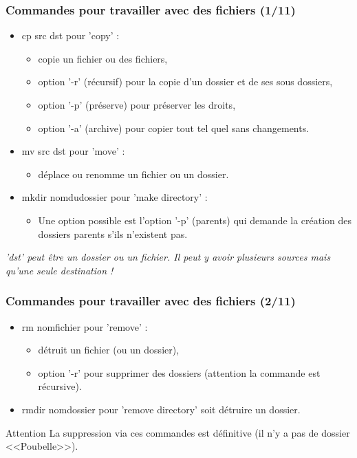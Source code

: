 \documentclass[handout,10pt]{beamer}
\begin{document}
\frame
{
    \frametitle{Commandes pour travailler avec des fichiers (1/11)}

    \begin{itemize}
        \item {\ttfamily cp src dst} pour 'copy' :
            \begin{itemize}
                \item copie un fichier ou des fichiers,
                \item option '-r' (récursif) pour la copie d'un dossier et de ses sous dossiers,
                \item option '-p' (préserve) pour préserver les droits,
                \item option '-a' (archive) pour copier tout tel quel sans changements.
            \end{itemize}
        \item {\ttfamily mv src dst} pour 'move' :
            \begin{itemize}
                \item déplace ou renomme un fichier ou un dossier.
            \end{itemize}
        \item {\ttfamily mkdir nomdudossier} pour 'make directory' :
            \begin{itemize}
                \item Une option possible est l'option '-p' (parents) qui demande la création des dossiers parents s'ils n'existent pas.
            \end{itemize}
    \end{itemize}

    \textit{'{\ttfamily dst}' peut être un dossier ou un fichier. Il peut y avoir plusieurs sources mais qu'une seule destination !}
}


\frame
{
    \frametitle{Commandes pour travailler avec des fichiers (2/11)}

    \begin{itemize}
        \item {\ttfamily rm nomfichier} pour 'remove' :
            \begin{itemize}
                \item détruit un fichier (ou un dossier),
                \item option '-r' pour supprimer des dossiers (attention la commande est récursive).
            \end{itemize}
        \item {\ttfamily rmdir nomdossier} pour 'remove directory' soit détruire un dossier.
    \end{itemize}

    \begin{alertblock}{Attention}
        La suppression via ces commandes est définitive (il n'y a pas de dossier <<Poubelle>>).
    \end{alertblock}
}
\end{document}
